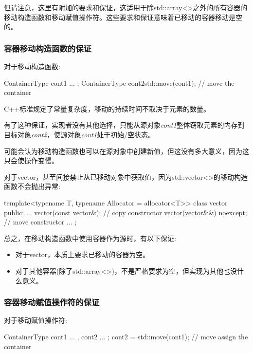 但请注意，这里有附加的要求和保证，这适用于除std::array<>之外的所有容器的移动构造函数和移动赋值操作符。这些要求和保证意味着已移动的容器移动是空的。

\subsubsection{容器移动构造函数的保证}

对于移动构造函数:

\begin{cppcode}
ContainerType cont1{ ... };
ContainerType cont2{std::move(cont1)}; // move the container
\end{cppcode}

C++标准规定了常量复杂度，移动的持续时间不取决于元素的数量。

有了这种保证，实现者没有其他选择，只能从源对象\textit{cont1}整体窃取元素的内存到目标对象\textit{cont2}，使源对象\textit{cont1}处于初始/空状态。

可能会认为移动构造函数也可以在源对象中创建新值，但这没有多大意义，因为这只会使操作变慢。

对于vector，甚至间接禁止从已移动对象中获取值，因为std::vector<>的移动构造函数不会抛出异常:

\begin{cppcode}
template<typename T, typename Allocator = allocator<T>>
class vector {
	public:
	...
	vector(const vector&); // copy constructor
	vector(vector&&) noexcept; // move constructor
	...
};
\end{cppcode}

总之，在移动构造函数中使用容器作为源时，有以下保证:

\begin{itemize}
	\item 对于vector，本质上要求已移动的容器为空。
	\item 对于其他容器(除了std::array<>)，不是严格要求为空，但实现为其他也没什么意义。
\end{itemize}

\subsubsection{容器移动赋值操作符的保证}

对于移动赋值操作符:

\begin{cppcode}
ContainerType cont1{ ... }, cont2{ ... };
cont2 = std::move(cont1); // move assign the container
\end{cppcode}

